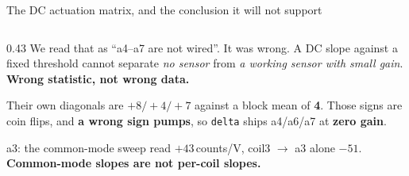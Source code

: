 \documentclass[aspectratio=169]{beamer}
\begin{document}
\begin{frame}{The DC actuation matrix, and the conclusion it will not support}
\begin{columns}[T]
\begin{column}{0.43\textwidth}
      \vspace{1.5mm}
      We read that as ``a4--a7 are not wired''. It was wrong. A DC slope
      against a fixed threshold cannot separate \emph{no sensor} from \emph{a
      working sensor with small gain}. \textbf{Wrong statistic, not wrong data.}

      \vspace{1.5mm}
      Their own diagonals are $+8 / +4 / +7$ against a block mean of
      \textbf{4}. Those signs are coin flips, and \textbf{a wrong sign pumps},
      so \texttt{delta} ships a4/a6/a7 at \textbf{zero gain}.

      \vspace{1.5mm}
      a3: the common-mode sweep read $+43$\,counts/V, coil3 $\to$ a3 alone
      $-51$. \textbf{Common-mode slopes are not per-coil slopes.}
    \end{column}
  \end{columns}
\end{frame}
\end{document}
